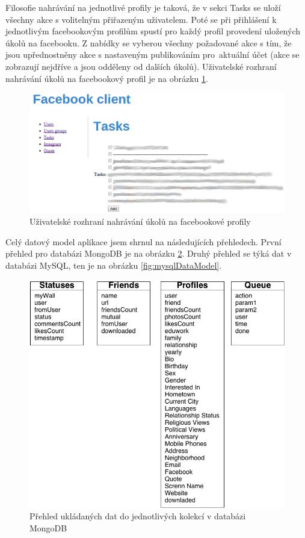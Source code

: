 \documentclass[thesis=M,czech]{FITthesis}[2013/05/10]
\begin{document}
Filosofie nahrávání na jednotlivé profily je taková, že v sekci Tasks se uloží všechny akce s volitelným přiřazeným uživatelem. Poté se při přihlášení k jednotlivým facebookovým profilům spustí pro každý profil provedení uložených úkolů na facebooku. Z nabídky se vyberou všechny požadované akce s tím, že jsou upřednostněny akce s nastaveným publikováním pro~aktuální účet (akce se zobrazují nejdříve a jsou odděleny od dalších úkolů). Uživatelské rozhraní nahrávání úkolů na facebookový profil je na obrázku \ref{fig:fcUserTask}.

\begin{figure}[h]
\begin{center}
\includegraphics[width=5in]{figures/fcUserTask.png}
\caption{Uživatelské rozhraní nahrávání úkolů na facebookové profily}
\label{fig:fcUserTask}
\end{center}
\end{figure}

Celý datový model aplikace jsem shrnul na následujících přehledech. První přehled pro databázi MongoDB je na obrázku \ref{fig:mongoDataModel}. Druhý přehled se týká dat v databázi MySQL, ten je na obrázku \ref{fig:mysqlDataModel}.

\begin{figure}[h]
\begin{center}
\includegraphics[width=5in]{figures/mongoDataModel.png}
\caption{Přehled ukládaných dat do jednotlivých kolekcí v databázi MongoDB}
\label{fig:mongoDataModel}
\end{center}
\end{figure}
\end{document}
